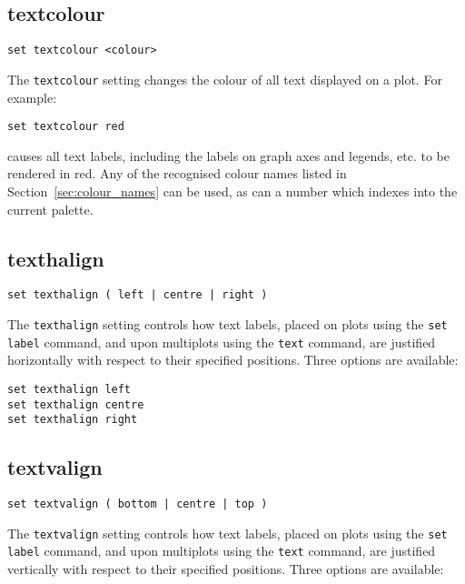 \subsection{textcolour}

\begin{verbatim}
set textcolour <colour>
\end{verbatim}

The {\tt textcolour} setting changes the colour of all text displayed on a plot.
For example:

\begin{verbatim}
set textcolour red
\end{verbatim}

\noindent causes all text labels, including the labels on graph axes and
legends, etc. to be rendered in red. Any of the recognised colour names listed
in Section~\ref{sec:colour_names} can be used, as can a number which indexes
into the current palette.


\subsection{texthalign}

\begin{verbatim}
set texthalign ( left | centre | right )
\end{verbatim}

The {\tt texthalign} setting controls how text labels, placed on plots using the
{\tt set label} command, and upon multiplots using the {\tt text} command, are
justified horizontally with respect to their specified positions. Three options
are available:

\begin{verbatim}
set texthalign left
set texthalign centre
set texthalign right
\end{verbatim}


\subsection{textvalign}

\begin{verbatim}
set textvalign ( bottom | centre | top )
\end{verbatim}

The {\tt textvalign} setting controls how text labels, placed on plots using the
{\tt set label} command, and upon multiplots using the {\tt text} command, are
justified vertically with respect to their specified positions. Three options
are available:

